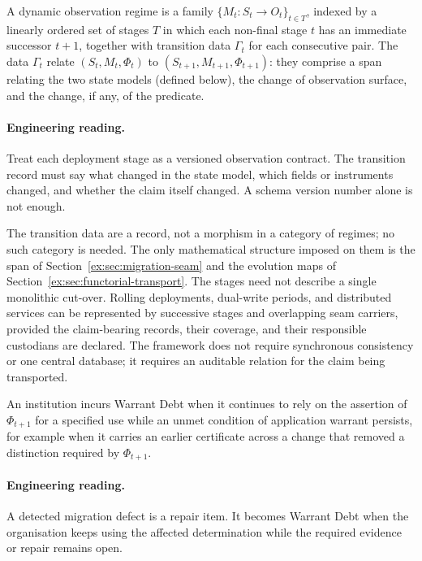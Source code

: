 \documentclass[smallextended,envcountsect,envcountsame,natbib]{svjour3}
\begin{document}
\begin{definition}
A dynamic observation regime is a family $\{M_t:S_t\to O_t\}_{t \in T}$, indexed by a linearly ordered set of stages $T$ in which each non-final stage $t$ has an immediate successor $t+1$, together with transition data $\Gamma_t$ for each consecutive pair. The data $\Gamma_t$ relate $(S_t,M_t,\Phi_t)$ to $(S_{t+1},M_{t+1},\Phi_{t+1})$: they comprise a span relating the two state models (defined below), the change of observation surface, and the change, if any, of the predicate.
\end{definition}

\paragraph{Engineering reading.} Treat each deployment stage as a versioned observation contract. The transition record must say what changed in the state model, which fields or instruments changed, and whether the claim itself changed. A schema version number alone is not enough.

The transition data are a record, not a morphism in a category of regimes; no such category is needed. The only mathematical structure imposed on them is the span of Section~\ref{ex:sec:migration-seam} and the evolution maps of Section~\ref{ex:sec:functorial-transport}. The stages need not describe a single monolithic cut-over. Rolling deployments, dual-write periods, and distributed services can be represented by successive stages and overlapping seam carriers, provided the claim-bearing records, their coverage, and their responsible custodians are declared. The framework does not require synchronous consistency or one central database; it requires an auditable relation for the claim being transported.

\begin{definition}\label{ex:def:dynamic-debt}
An institution incurs Warrant Debt when it continues to rely on the assertion of $\Phi_{t+1}$ for a specified use while an unmet condition of application warrant persists, for example when it carries an earlier certificate across a change that removed a distinction required by $\Phi_{t+1}$.
\end{definition}

\paragraph{Engineering reading.} A detected migration defect is a repair item. It becomes Warrant Debt when the organisation keeps using the affected determination while the required evidence or repair remains open.
\end{document}
